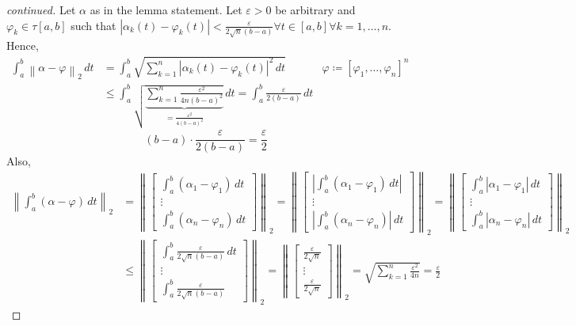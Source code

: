 \documentclass{article}
\newcommand{\norm}[1]{\left\|#1\right\|}
\newcommand{\card}[1]{\left|#1\right|}
\begin{document}
\begin{proof}[continued]
  Let $\alpha$ as in the lemma statement.
  Let $\varepsilon > 0$ be arbitrary and $\varphi_k \in \tau[a,b]$ such that $\card{\alpha_k(t) - \varphi_k(t)} < \frac{\varepsilon}{2 \sqrt{n} (b - a)} \forall t \in [a,b] \forall k = 1, \dots, n$. Hence,
  \begin{align*}
    \int_a^b \norm{\alpha - \varphi}_2 \, dt &= \int_a^b \sqrt{\sum_{k=1}^n \card{\alpha_k(t) - \varphi_k(t)}^2 \, dt}     & \varphi \coloneqq [\varphi_1, \dots, \varphi_n]^n \\
        &\leq \int_a^b \sqrt{\underbrace{\sum_{k=1}^n \frac{\varepsilon^2}{4n (b - a)^2}}_{= \frac{\varepsilon^2}{4 (b - a)^2}}} \, dt
        = \int_a^b \frac{\varepsilon}{2 (b - a)} \, dt
  \end{align*}
  \[ (b - a) \cdot \frac{\varepsilon}{2 (b - a)} = \frac{\varepsilon}{2} \]
  Also,
  \begin{align*}
    \norm{\int_a^b (\alpha - \varphi) \, dt}_2
      &= \norm{\begin{bmatrix} \int_a^b (\alpha_1 - \varphi_1) \, dt \\ \vdots \\ \int_a^b (\alpha_n - \varphi_n) \, dt \end{bmatrix}}_2
      = \norm{\begin{bmatrix} \card{\int_a^b (\alpha_1 - \varphi_1) \, dt} \\ \vdots \\ \card{\int_a^b (\alpha_n - \varphi_n)} \, dt \end{bmatrix}}_2
      = \norm{\begin{bmatrix} \int_a^b \card{\alpha_1 - \varphi_1} \, dt \\ \vdots \\ \int_a^b \card{\alpha_n - \varphi_n} \, dt \end{bmatrix}}_2 \\
      &\leq \norm{\begin{bmatrix} \int_a^b \frac{\varepsilon}{2\sqrt n (b - a)} \, dt \\ \vdots \\ \int_a^b \frac{\varepsilon}{2 \sqrt n (b - a)} \end{bmatrix}}_2
      = \norm{\begin{bmatrix} \frac{\varepsilon}{2 \sqrt n} \\ \vdots \\ \frac{\varepsilon}{2 \sqrt n} \end{bmatrix}}_2
      = \sqrt{\sum_{k=1}^n \frac{\varepsilon^2}{4n}} = \frac\varepsilon2

\end{align*}
\end{proof}
\end{document}
